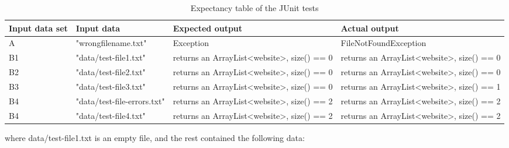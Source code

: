 \begin{table}[!h]
    \caption{Expectancy table of the JUnit tests}
    \begin{tabular}{|l|p{85pt}|p{100pt}|p{100pt}|}
        \hline
        \textbf{Input data set} & \textbf{Input data} & \textbf{Expected output} & \textbf{Actual output} \\ \hline
        A & "wrongfilename.txt" & Exception & FileNotFoundException \\ \hline
        B1 & "data/test-file1.txt" & returns an ArrayList<website>, size() == 0 & returns an ArrayList<website>, size() == 0 \\ \hline
        B2 & "data/test-file2.txt" & returns an ArrayList<website>, size() == 0 & returns an ArrayList<website>, size() == 0 \\ \hline
        B3 & "data/test-file3.txt" & returns an ArrayList<website>, size() == 0 & returns an ArrayList<website>, size() == 1 \\ \hline
        B4 & "data/test-file-errors.txt" & returns an ArrayList<website>, size() == 2 & returns an ArrayList<website>, size() == 2 \\ \hline
        B4 & "data/test-file4.txt" & returns an ArrayList<website>, size() == 2 & returns an ArrayList<website>, size() == 2 \\ \hline
    \end{tabular}
    \label{FH:resuts}
\end{table}

where data/test-file1.txt is an empty file, and the rest contained the following data:

